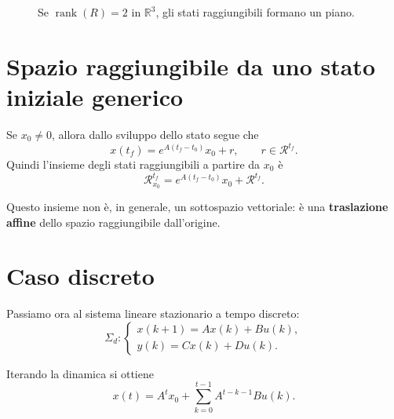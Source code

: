 \begin{figure}[H]
\centering
{}
\caption{Se \(\operatorname{rank}(R)=2\) in \(\mathbb{R}^3\), gli stati raggiungibili formano un piano.}
\label{fig:L11_piano_raggiungibile}
\end{figure}

\section{Spazio raggiungibile da uno stato iniziale generico}

Se \(x_0\neq 0\), allora dallo sviluppo dello stato segue che
\[
x(t_f)=e^{A(t_f-t_0)}x_0+r,
\qquad r\in\mathcal{R}^{t_f}.
\]
Quindi l’insieme degli stati raggiungibili a partire da \(x_0\) è
\begin{equation}
\mathcal{R}^{t_f}_{x_0}=e^{A(t_f-t_0)}x_0+\mathcal{R}^{t_f}.
\label{eq:L11_R_x0}
\end{equation}

Questo insieme non è, in generale, un sottospazio vettoriale: è una \textbf{traslazione affine} dello spazio raggiungibile dall’origine.

\section{Caso discreto}

Passiamo ora al sistema lineare stazionario a tempo discreto:
\begin{equation}
\Sigma_d:
\begin{cases}
x(k+1)=Ax(k)+Bu(k),\\
y(k)=Cx(k)+Du(k).
\end{cases}
\label{eq:L11_sistema_td}
\end{equation}

Iterando la dinamica si ottiene
\begin{equation}
x(t)=A^t x_0+\sum_{k=0}^{t-1}A^{t-k-1}Bu(k).
\label{eq:L11_soluzione_td}
\end{equation}

